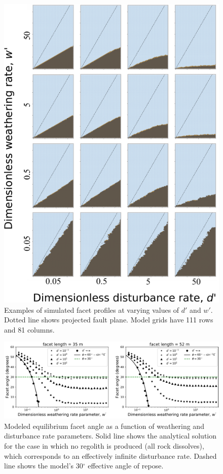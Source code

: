 \begin{figure}[ht!]
\centerline{\includegraphics[scale=1.5]{Figures/four_by_four_profiles_in_d-w_space.pdf}}
\caption{Examples of simulated facet profiles at varying values of $d'$ and $w'$. Dotted line shows projected fault plane. Model grids have 111 rows and 81 columns.}
\label{fig:dwprofiles}
\end{figure}

\begin{figure}[ht!]
\centerline{\includegraphics[scale=0.8]{Figures/facet_angle_vs_dw.pdf}}
\caption{Modeled equilibrium facet angle as a function of weathering and disturbance rate parameters. Solid line shows the analytical solution for the case in which no regolith is produced (all rock dissolves), which corresponds to an effectively infinite disturbance rate. Dashed line shows the model's 30$^\circ$ effective angle of repose.}
\label{fig:angw}
\end{figure}

